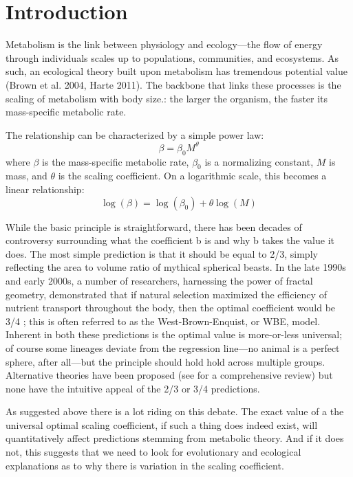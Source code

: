 \documentclass[a4paper,11pt]{article}
\begin{document}
\section*{Introduction}

Metabolism is the link between physiology and ecology---the flow of energy through individuals scales up to populations, communities, and ecosystems. As such, an ecological theory built upon metabolism has tremendous potential value (Brown et al. 2004, Harte 2011). The backbone that links these processes is the scaling of metabolism with body size.: the larger the organism, the faster its mass-specific metabolic rate. 

The relationship can be characterized by a simple power law:
\begin{equation}
  \beta = \beta_0 M^{\theta}
\end{equation}
where $\beta$ is the mass-specific metabolic rate, $\beta_0$ is a normalizing constant, $M$ is mass, and $\theta$ is the scaling coefficient. On a logarithmic scale, this becomes a linear relationship:
\begin{equation}
  \log(\beta) = \log(\beta_0) + \theta \log(M)
\end{equation}
 
While the basic principle is straightforward, there has been decades of controversy surrounding what the coefficient b is and why b takes the value it does. The most simple prediction is that it should be equal to 2/3, simply reflecting the area to volume ratio of mythical spherical beasts. In the late 1990s and early 2000s, a number of researchers, harnessing the power of fractal geometry, demonstrated that if natural selection maximized the efficiency of nutrient transport throughout the body, then the optimal coefficient would be 3/4 \citep{west1997, west1999, brown2004}; this is often referred to as the West-Brown-Enquist, or WBE, model. Inherent in both these predictions is the optimal value is more-or-less universal; of course some lineages deviate from the regression line---no animal is a perfect sphere, after all—but the principle should hold hold across multiple groups. Alternative theories have been proposed (see \citep{glazier2010} for a comprehensive review) but none have the intuitive appeal of the 2/3 or 3/4 predictions.

As suggested above there is a lot riding on this debate. The exact value of a the universal optimal scaling coefficient, if such a thing does indeed exist, will quantitatively affect predictions stemming from metabolic theory. And if it does not, this suggests that we need to look for evolutionary and ecological explanations as to why there is variation in the scaling coefficient.
\end{document}
